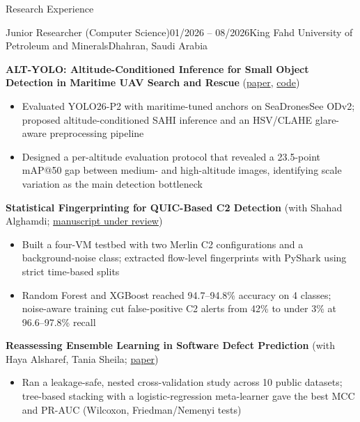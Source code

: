 \documentclass{resume}
\begin{document}
\begin{rSection}{Research Experience}

\begin{rSubsection}{Junior Researcher (Computer Science)}{01/2026 -- 08/2026}{King Fahd University of Petroleum and Minerals}{Dhahran, Saudi Arabia}
\item \textbf{ALT-YOLO: Altitude-Conditioned Inference for Small Object Detection in Maritime UAV Search and Rescue}
  (\href{https://drive.google.com/file/d/1JEkD6beCYfyOblq_QpfxwQKzEPLIr-Cl/view?usp=sharing}{paper}, \href{https://github.com/LydiaAbrahamF/alt-yolo-maritime-uav-sar}{code})
  \begin{itemize}[leftmargin=1.2em,itemsep=0pt,topsep=0pt,label=--]
  \item Evaluated YOLO26-P2 with maritime-tuned anchors on SeaDronesSee ODv2; proposed altitude-conditioned SAHI inference and an HSV/CLAHE glare-aware preprocessing pipeline
  \item Designed a per-altitude evaluation protocol that revealed a 23.5-point mAP@50 gap between medium- and high-altitude images, identifying scale variation as the main detection bottleneck
  \end{itemize}
\item \textbf{Statistical Fingerprinting for QUIC-Based C2 Detection} (with Shahad Alghamdi; \href{https://drive.google.com/file/d/1rFIabZUrpXU0cM5nXjSSYqE4i4grJCRN/view?usp=sharing}{manuscript under review})
  \begin{itemize}[leftmargin=1.2em,itemsep=0pt,topsep=0pt,label=--]
  \item Built a four-VM testbed with two Merlin C2 configurations and a background-noise class; extracted flow-level fingerprints with PyShark using strict time-based splits
  \item Random Forest and XGBoost reached 94.7--94.8\% accuracy on 4 classes; noise-aware training cut false-positive C2 alerts from 42\% to under 3\% at 96.6--97.8\% recall
  \end{itemize}
\item \textbf{Reassessing Ensemble Learning in Software Defect Prediction} (with Haya Alsharef, Tania Sheila; \href{https://drive.google.com/file/d/1sJM1kNMcjUU2p8fZhc8eNdbJNwFsTcp5/view?usp=drive_link}{paper})
  \begin{itemize}[leftmargin=1.2em,itemsep=0pt,topsep=0pt,label=--]
  \item Ran a leakage-safe, nested cross-validation study across 10 public datasets; tree-based stacking with a logistic-regression meta-learner gave the best MCC and PR-AUC (Wilcoxon, Friedman/Nemenyi tests)
  \end{itemize}
\end{rSubsection}


\end{rSection}
\end{document}
